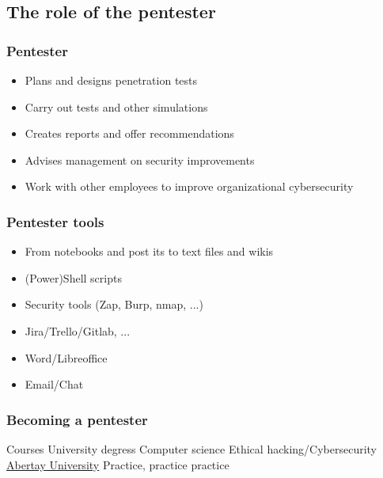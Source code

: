\subsection{The role of the pentester}

\begin{frame}
    \frametitle{Pentester}

    \note[item]{
    }
    
    \begin{itemize}
    		\item Plans and designs penetration tests
    		\item Carry out tests and other simulations
    		\item Creates reports and offer recommendations
    		\item Advises management on security improvements
    		\item Work with other employees to improve organizational cybersecurity
    \end{itemize}
\end{frame}

\begin{frame}
    \frametitle{Pentester tools}

    \note[item]{
    }
    
    \begin{itemize}
    		\item From notebooks and post its to text files and wikis
    		\item (Power)Shell scripts
    		\item Security tools (Zap, Burp, nmap, ...)
    		\item Jira/Trello/Gitlab, ...
    		\item Word/Libreoffice
    		\item Email/Chat    		
    \end{itemize}
\end{frame}

\begin{frame}
    \frametitle{Becoming a pentester}

    \note[item]{
    }
    
	\begin{outline}
		\1 Courses
		\1 University degress
			\2 Computer science
			\2 Ethical hacking/Cybersecurity
				\3 \href{https://www.abertay.ac.uk/course-search/undergraduate/cybersecurity/}{Abertay University}
		\1 Practice, practice practice
	\end{outline}
\end{frame}

